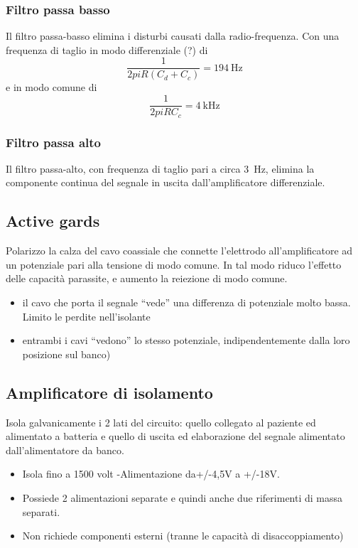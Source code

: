 \subsubsection{Filtro passa basso}
Il filtro passa-basso elimina i disturbi causati dalla radio-frequenza.
Con una frequenza di taglio in modo differenziale (?) di
\begin{equation*}
	\frac{1}{2 pi R ( C_d + C_c ) } = \SI{194}{\Hz}
\end{equation*}
e in modo comune di
\begin{equation*}
	\frac{1}{2 pi R C_c} = \SI{4}{\kHz}
\end{equation*}

\subsubsection{Filtro passa alto}
Il filtro passa-alto, con frequenza di taglio pari a circa \SI{3}{\Hz}, elimina la componente continua del segnale in uscita dall’amplificatore differenziale.

\subsection{Active gards}
Polarizzo la calza del cavo coassiale che connette l’elettrodo all’amplificatore ad un
potenziale pari alla tensione di modo comune.
In tal modo riduco l’effetto delle capacità parassite, e aumento la reiezione di modo
comune.
\begin{itemize}
\item il cavo che porta il segnale “vede” una differenza di potenziale molto bassa. Limito le
perdite nell’isolante
\item entrambi i cavi “vedono” lo stesso potenziale, indipendentemente dalla loro posizione sul
banco)
\end{itemize}

\subsection{Amplificatore di isolamento}
Isola galvanicamente i 2 lati del circuito: quello collegato al paziente ed alimentato a
batteria e quello di uscita ed elaborazione del segnale alimentato dall’alimentatore da
banco.
\begin{itemize}
	\item Isola fino a 1500 volt -Alimentazione da+/-4,5V a +/-18V.
	\item Possiede 2 alimentazioni separate e quindi anche due riferimenti di massa separati.
	\item Non richiede componenti esterni (tranne le capacità di disaccoppiamento)
\end{itemize}


